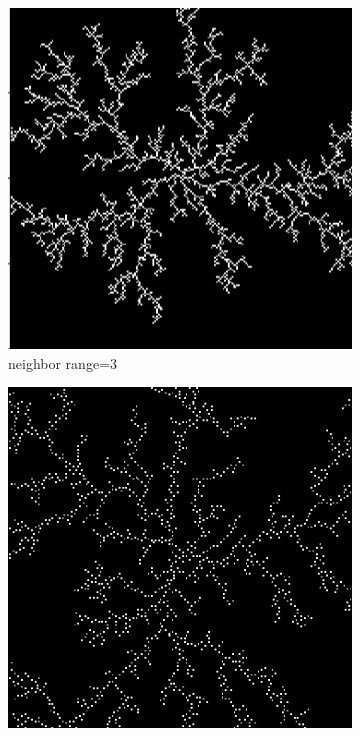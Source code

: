 \documentclass[aps,preprint,groupedaddress,letterpaper]{revtex4-1}
\begin{document}
\begin{figure}[h]
     \centering
     \begin{subfigure}[h]{0.23\textwidth}
         \centering
         \includegraphics[width=\textwidth]{img/Neighbor/3.png}
         \caption{neighbor range=3}
         \label{nr3}
     \end{subfigure}
     \hfill
     \begin{subfigure}[h]{0.23\textwidth}
         \centering
         \includegraphics[width=\textwidth]{img/Neighbor/5.png}

\end{subfigure}
\end{figure}
\end{document}
